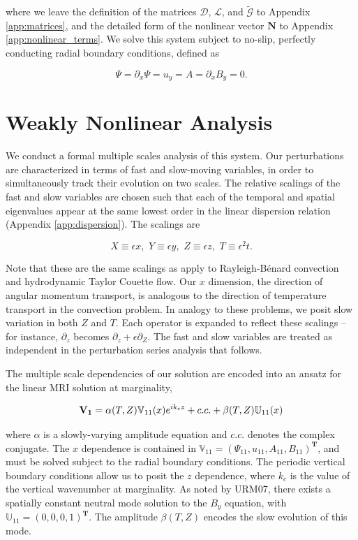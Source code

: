 \documentclass{emulateapj}
\newcommand{\beq}{\begin{equation}}
\newcommand{\eeq}{\end{equation}}
\begin{document}
where we leave the definition of the matrices $\mathcal{D}$, $\mathcal{L}$, and $\widetilde{\mathcal{G}}$ to Appendix \ref{app:matrices}, and the detailed form of the nonlinear vector $\mathbf{N}$ to Appendix \ref{app:nonlinear_terms}. We solve this system subject to no-slip, perfectly conducting radial boundary conditions, defined as

\beq
\Psi = \partial_x \Psi = u_y = A = \partial_x B_y = 0.
\eeq


\section{Weakly Nonlinear Analysis}\label{sec:wnl}

We conduct a formal multiple scales analysis of this system. Our perturbations are characterized in terms of fast and slow-moving variables, in order to simultaneously track their evolution on two scales. The relative scalings of the fast and slow variables are chosen such that each of the temporal and spatial eigenvalues appear at the same lowest order in the linear dispersion relation (Appendix \ref{app:dispersion}). The scalings are

\beq\label{scalings}
X \equiv \epsilon x,  \, \, Y \equiv \epsilon y, \, \, Z \equiv \epsilon z, \, \, T \equiv \epsilon^2 t.
\eeq

Note that these are the same scalings as apply to Rayleigh-B\'enard convection and hydrodynamic Taylor Couette flow. Our $x$ dimension, the direction of angular momentum transport, is analogous to the direction of temperature transport in the convection problem. In analogy to these problems, we posit slow variation in both $Z$ and $T$. Each operator is expanded to reflect these scalings -- for instance, $\partial_z$ becomes $\partial_z + \epsilon\partial_Z$. The fast and slow variables are treated as independent in the perturbation series analysis that follows.

The multiple scale dependencies of our solution are encoded into an ansatz for the linear MRI solution at marginality,

\beq
\label{V1_ansatz}
\mathbf{V_1} = \alpha(T, Z) \mathbb{V}_{11}(x) e^{i k_c z} + c.c. + \beta(T, Z)\mathbb{U}_{11}(x)\\
\eeq

where $\alpha$ is a slowly-varying amplitude equation and $c.c.$ denotes the complex conjugate. The $x$ dependence is contained in $\mathbb{V}_{11} = (\Psi_{11}, u_{11}, A_{11}, B_{11})^\mathbf{T}$, and must be solved subject to the radial boundary conditions. The periodic vertical boundary conditions allow us to posit the $z$ dependence, where $k_c$ is the value of the vertical wavenumber at marginality. As noted by URM07, there exists a spatially constant neutral mode solution to the $B_y$ equation, with $\mathbb{U}_{11} = (0, 0, 0, 1)^\mathbf{T}$. The amplitude $\beta(T, Z)$ encodes the slow evolution of this mode.
\end{document}
